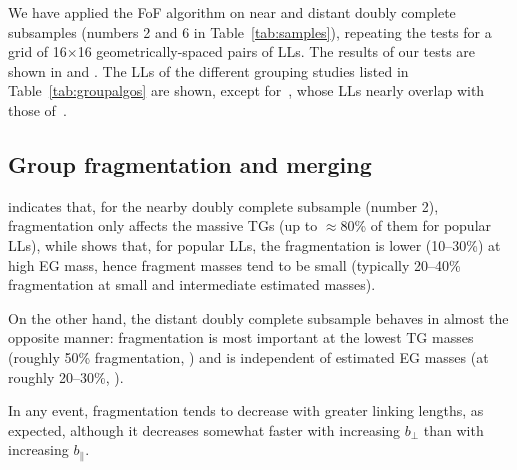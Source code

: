 %
We have applied the FoF algorithm on near and distant doubly complete
subsamples (numbers 2 and 6 in Table~\ref{tab:samples}), repeating the tests
for a grid of 16$\times$16 geometrically-spaced pairs of LLs. The results of
our tests are shown in  and
. The LLs of the different grouping studies listed
in Table~\ref{tab:groupalgos} are shown, except for~\cite{MZ02}, whose LLs
nearly overlap with those of~\cite{Eke+04}.

\subsection{Group fragmentation and merging}

 indicates that, for the nearby doubly complete
subsample (number 2), fragmentation only affects the massive TGs (up to
$\approx$80\% of them for popular LLs), while
 shows that, for popular LLs, the
fragmentation is lower (10--30\%) at high EG mass, hence fragment masses tend
to be small (typically 20--40\% fragmentation at small and intermediate
estimated masses).

On the other hand, the distant doubly complete subsample behaves in almost the
opposite manner: fragmentation is most important at the lowest TG masses
(roughly 50\% fragmentation, ) and is independent
of estimated EG masses (at roughly 20--30\%,
).

In any event, fragmentation tends to decrease with greater linking lengths, as
expected, although it decreases somewhat faster with increasing $b_\perp$ than
with increasing $b_\parallel$.

